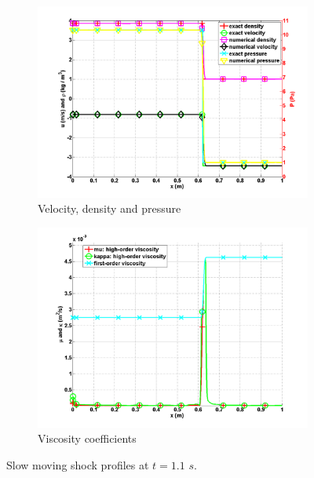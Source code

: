 \begin{figure}[H]
        \centering
        \begin{subfigure}[b]{0.8\textwidth}
                \centering
                \includegraphics[width=\textwidth]{figures/SlowMovingShock_density_velocity_pressure_profiles.png}
                \caption{Velocity, density and pressure}
                \label{fig:profiles_sms}
        \end{subfigure}%

        \begin{subfigure}[b]{0.8\textwidth}
                \centering
                \includegraphics[width=\textwidth]{figures/SlowMovingShock_viscosity.png}
                \caption{Viscosity coefficients}
                \label{fig:viscosity_sms}
        \end{subfigure} 
        \caption{Slow moving shock profiles at $t=1.1$ $s$.}\label{fig:low_moving_shock}
\end{figure} 
